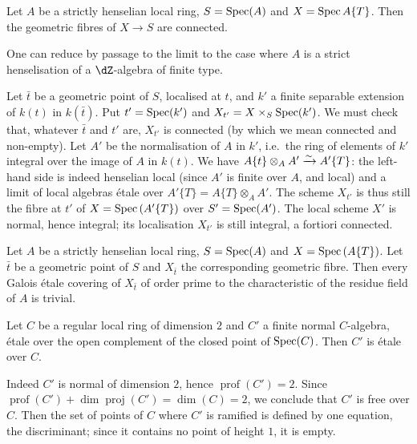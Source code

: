 \begin{proposition}\label{I:5-2-2}
Let $A$ be a strictly henselian local ring, $S=\operatorname{Spec}(A)$ and
$X=\operatorname{Spec} A\{T\}$. Then the geometric fibres of $X\to S$ are connected.
\end{proposition}

One can reduce by passage to the limit to the case where $A$ is a strict
henselisation of a $\dZ$-algebra of finite type.

Let $\bar t$ be a geometric point of $S$, localised at $t$, and $k'$ a
finite separable extension of $k(t)$ in $k(\bar t)$. Put $t'=\operatorname{Spec}(k')$
and $X_{t'} = X\times_S\operatorname{Spec}(k')$. We must check that, whatever
$\bar t$ and $t'$ are, $X_{t'}$ is connected (by which we mean connected and
non-empty). Let $A'$ be the normalisation of $A$ in $k'$, i.e.\ the ring of
elements of $k'$ integral over the image of $A$ in $k(t)$. We have
$A\{t\}\otimes_A A'\xrightarrow\sim A'\{T\}$: the left-hand side is indeed henselian
local (since $A'$ is finite over $A$, and local) and a limit of local
algebras \'etale over $A'\{T\}=A\{T\}\otimes_A A'$. The scheme $X_{t'}$ is thus
still the fibre at $t'$ of $X=\operatorname{Spec}\left(A'\{T\}\right)$ over $S'=\operatorname{Spec}(A')$.
The local scheme $X'$ is normal, hence integral; its localisation $X_{t'}$ is
still integral, a fortiori connected. 





\begin{proposition}\label{I:5-2-3}
Let $A$ be a strictly henselian local ring, $S=\operatorname{Spec}(A)$ and
$X=\operatorname{Spec}\left(A\{T\}\right)$. Let $\bar t$ be a geometric point of $S$
and $X_{\bar t}$ the corresponding geometric fibre. Then every Galois
\'etale covering of $X_{\bar t}$ of order prime to the characteristic of the
residue field of $A$ is trivial.
\end{proposition}





\begin{lemma} \label{I:5-2-4} %
Let $C$ be a regular local ring of dimension $2$ and $C'$ a finite normal
$C$-algebra, \'etale over the open complement of the closed point
of $\operatorname{Spec}(C)$. Then $C'$ is \'etale over $C$.
\end{lemma}

Indeed $C'$ is normal of dimension $2$, hence $\operatorname{prof}(C')=2$.
Since $\operatorname{prof}(C')+\dim\operatorname{proj}(C') = \dim(C)=2$, we
conclude that $C'$ is free over $C$. Then the set of points of $C$ where
$C'$ is ramified is defined by one equation, the discriminant; since it
contains no point of height $1$, it is empty. 






